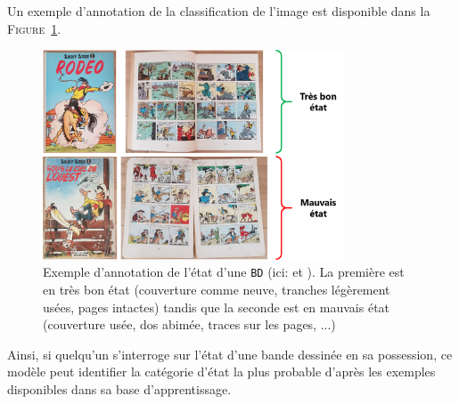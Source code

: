 			Un exemple d'annotation de la classification de l'image est disponible dans la \textsc{Figure~\ref{figure:2.1.2.B-PRESENTATION-ANNOTATION-EXEMPLES-CLASSIFICATION}}.
			\begin{leftBarExamples}
				\begin{figure}[H]
					\centering
					\includegraphics[width=0.80\textwidth]{figures/etatdelart-morris-1950-lucky-luke-2-1952-lucky-luke-4}
					\caption{
						Exemple d'annotation de l'état d'une \texttt{BD} (ici: \cite{morris-goscinny:1950:rodeo} et \cite{morris-goscinny:1952:sous-ciel-ouest}).
						La première est en très bon état (couverture comme neuve, tranches légèrement usées, pages intactes) tandis que la seconde est en mauvais état (couverture usée, dos abimée, traces sur les pages, ...)
					}
					\label{figure:2.1.2.B-PRESENTATION-ANNOTATION-EXEMPLES-CLASSIFICATION}
				\end{figure}
			\end{leftBarExamples}
			
			Ainsi, si quelqu'un s'interroge sur l'état d'une bande dessinée en sa possession, ce modèle peut identifier la catégorie d'état la plus probable d'après les exemples disponibles dans sa base d'apprentissage.
			
